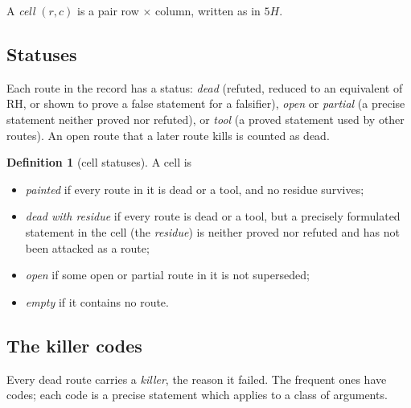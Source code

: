 \documentclass[11pt]{amsart}
\theoremstyle{definition}
\newtheorem{definition}[theorem]{Definition}
\theoremstyle{remark}
\begin{document}
A \emph{cell} $(r,c)$ is a pair row $\times$ column, written as in $5H$.

\subsection{Statuses}
Each route in the record has a status: \emph{dead} (refuted, reduced to an equivalent of RH, or shown
to prove a false statement for a falsifier), \emph{open} or \emph{partial} (a precise statement neither
proved nor refuted), or \emph{tool} (a proved statement used by other routes). An open route that a
later route kills is counted as dead.

\begin{definition}[cell statuses]\label{def:status}
A cell is
\begin{itemize}
\item \emph{painted} if every route in it is dead or a tool, and no residue survives;
\item \emph{dead with residue} if every route is dead or a tool, but a precisely formulated statement
 in the cell (the \emph{residue}) is neither proved nor refuted and has not been attacked as a route;
\item \emph{open} if some open or partial route in it is not superseded;
\item \emph{empty} if it contains no route.
\end{itemize}
\end{definition}

\subsection{The killer codes}\label{subsec:killers}
Every dead route carries a \emph{killer}, the reason it failed. The frequent ones have codes; each code
is a precise statement which applies to a class of arguments.
\end{document}
